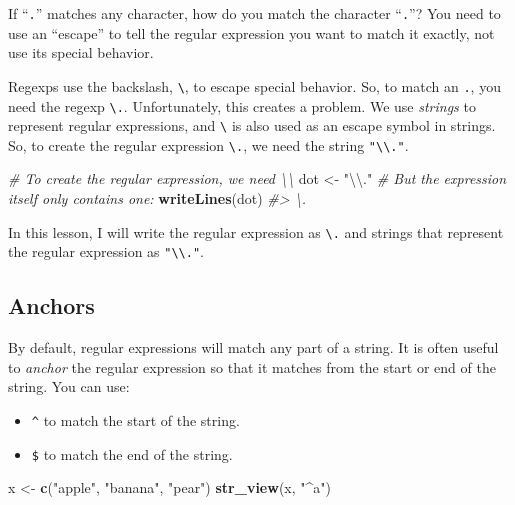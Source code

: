 \documentclass[]{book}
\newenvironment{Shaded}{\begin{snugshade}}{\end{snugshade}}
\newcommand{\KeywordTok}[1]{\textcolor[rgb]{0.13,0.29,0.53}{\textbf{#1}}}
\newcommand{\CharTok}[1]{\textcolor[rgb]{0.31,0.60,0.02}{#1}}
\newcommand{\StringTok}[1]{\textcolor[rgb]{0.31,0.60,0.02}{#1}}
\newcommand{\CommentTok}[1]{\textcolor[rgb]{0.56,0.35,0.01}{\textit{#1}}}
\newcommand{\NormalTok}[1]{#1}
\providecommand{\tightlist}{%
  \setlength{\itemsep}{0pt}\setlength{\parskip}{0pt}}
\begin{document}
If ``\texttt{.}'' matches any character, how do you match the character
``\texttt{.}''? You need to use an ``escape'' to tell the regular
expression you want to match it exactly, not use its special behavior.

Regexps use the backslash, \texttt{\textbackslash{}}, to escape special
behavior. So, to match an \texttt{.}, you need the regexp
\texttt{\textbackslash{}.}. Unfortunately, this creates a problem. We
use \emph{strings} to represent regular expressions, and
\texttt{\textbackslash{}} is also used as an escape symbol in strings.
So, to create the regular expression \texttt{\textbackslash{}.}, we need
the string \texttt{"\textbackslash{}\textbackslash{}."}.

\begin{Shaded}
\begin{Highlighting}[]
\CommentTok{# To create the regular expression, we need \textbackslash{}\textbackslash{}}
\NormalTok{dot <-}\StringTok{ "}\CharTok{\textbackslash{}\textbackslash{}}\StringTok{."}
\CommentTok{# But the expression itself only contains one:}
\KeywordTok{writeLines}\NormalTok{(dot)}
\CommentTok{#> \textbackslash{}.}
\end{Highlighting}
\end{Shaded}

In this lesson, I will write the regular expression as
\texttt{\textbackslash{}.} and strings that represent the regular
expression as \texttt{"\textbackslash{}\textbackslash{}."}.

\subsection{Anchors}\label{anchors}

By default, regular expressions will match any part of a string. It is
often useful to \emph{anchor} the regular expression so that it matches
from the start or end of the string. You can use:

\begin{itemize}
\tightlist
\item
  \texttt{\^{}} to match the start of the string.
\item
  \texttt{\$} to match the end of the string.
\end{itemize}

\begin{Shaded}
\begin{Highlighting}[]
\NormalTok{x <-}\StringTok{ }\KeywordTok{c}\NormalTok{(}\StringTok{"apple"}\NormalTok{, }\StringTok{"banana"}\NormalTok{, }\StringTok{"pear"}\NormalTok{)}
\KeywordTok{str_view}\NormalTok{(x, }\StringTok{"^a"}\NormalTok{)}
\end{Highlighting}
\end{Shaded}
\end{document}
